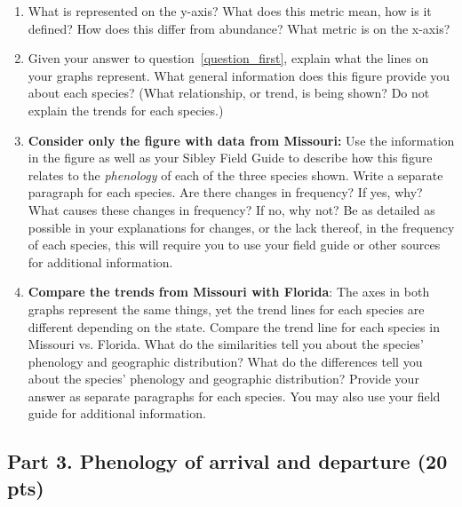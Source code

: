 \documentclass[12pt]{article}
\begin{document}
\begin{enumerate}
\item What is represented on the y-axis? What does this metric mean, how is it defined? How does this differ from abundance? What metric is on the x-axis?\label{question_first}

\item Given your answer to question~\ref{question_first}, explain what the lines on your graphs
represent. What general information does this figure provide you about
each species? (What relationship, or trend, is being shown? Do not
explain the trends for each species.)

\item \textbf{Consider only the figure with data from Missouri:} Use the
information in the figure as well as your Sibley Field Guide to describe
how this figure relates to the \emph{phenology} of each of the three
species shown. Write a separate paragraph for each species.
Are there changes in frequency? If yes, why? What causes these changes
in frequency? If no, why not? Be as detailed as possible in your
explanations for changes, or the lack thereof, in the frequency of each
species, this will require you to use your field guide or other sources
for additional information.

\item \textbf{Compare the trends from Missouri with Florida}: The axes in
both graphs represent the same things, yet the trend lines for each
species are different depending on the state. Compare the trend line for
each species in Missouri vs. Florida. What do the similarities tell you
about the species' phenology and geographic distribution? What do the
differences tell you about the species' phenology and geographic
distribution? Provide your answer as separate paragraphs for each
species. You may also use your field guide for additional information.


\end{enumerate}

\subsection*{Part 3. Phenology of arrival and departure (20 pts)}
\end{document}
